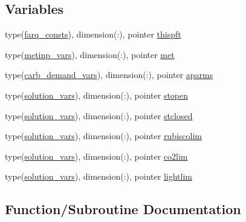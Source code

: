 \subsection*{Variables}
\begin{DoxyCompactItemize}
\item 
type(\hyperlink{structc34constants_1_1farq__consts}{farq\+\_\+consts}), dimension(\+:), pointer \hyperlink{namespacec34constants_a4a1314df0becf145f8a2365aa27d992d}{thispft}
\item 
type(\hyperlink{structc34constants_1_1metinp__vars}{metinp\+\_\+vars}), dimension(\+:), pointer \hyperlink{namespacec34constants_a6d1c98b7c360f24d485be8fc38bdd284}{met}
\item 
type(\hyperlink{structc34constants_1_1carb__demand__vars}{carb\+\_\+demand\+\_\+vars}), dimension(\+:), pointer \hyperlink{namespacec34constants_a844bf4288f019d9dcee7612f54d1e50c}{aparms}
\item 
type(\hyperlink{structc34constants_1_1solution__vars}{solution\+\_\+vars}), dimension(\+:), pointer \hyperlink{namespacec34constants_a5affd928720d3a40f01f1198b68b7fb3}{stopen}
\item 
type(\hyperlink{structc34constants_1_1solution__vars}{solution\+\_\+vars}), dimension(\+:), pointer \hyperlink{namespacec34constants_a083891d928147a7252ada72b49b240a3}{stclosed}
\item 
type(\hyperlink{structc34constants_1_1solution__vars}{solution\+\_\+vars}), dimension(\+:), pointer \hyperlink{namespacec34constants_a54cb2e4894b639d22e50b457b4208cfc}{rubiscolim}
\item 
type(\hyperlink{structc34constants_1_1solution__vars}{solution\+\_\+vars}), dimension(\+:), pointer \hyperlink{namespacec34constants_abed7f7ff7745473ac53005a45206f506}{co2lim}
\item 
type(\hyperlink{structc34constants_1_1solution__vars}{solution\+\_\+vars}), dimension(\+:), pointer \hyperlink{namespacec34constants_af66eea644957075da5a5285e735e143b}{lightlim}
\end{DoxyCompactItemize}


\subsection{Function/\+Subroutine Documentation}
\mbox{\label{namespacec34constants_a2bf287654403f231d7936113aaeb9cf6}} 
